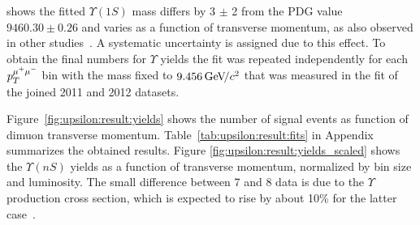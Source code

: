 
% 


 shows  the fitted $\Upsilon(1S)$
mass differs by 3 $\pm$ 2 \mevcc from the PDG value $9460.30 \pm  0.26$ \mevcc and
varies as a function of transverse momentum, as also observed in other
studies~\cite{Aaij:2013yaa}. A systematic uncertainty is assigned due to this
effect. To obtain the final numbers for $\Upsilon$ yields the fit was repeated
independently for each $p_T^{{\mu^+\mu^-}}$ bin with the \OneS mass fixed to
$9.456 {\mathrm{\,Ge\kern -0.1em V\!/}c^2}$ that was measured in the fit of the joined 2011 and 2012 datasets.

Figure~\ref{fig:upsilon:result:yields} shows the number of signal events as
function of dimuon transverse momentum. Table~\ref{tab:upsilon:result:fits} in
Appendix summarizes the obtained results. Figure
\ref{fig:upsilon:result:yields_scaled} shows the $\Upsilon(nS)$ yields as a
function of transverse momentum, normalized by bin size and luminosity. The
small difference between 7 and 8 \tev data is due to the $\Upsilon$ production
cross section, which is expected to rise by about 10\% for the latter
case~\cite{LHCb-PAPER-2011-036,Aaij:2013yaa}.




